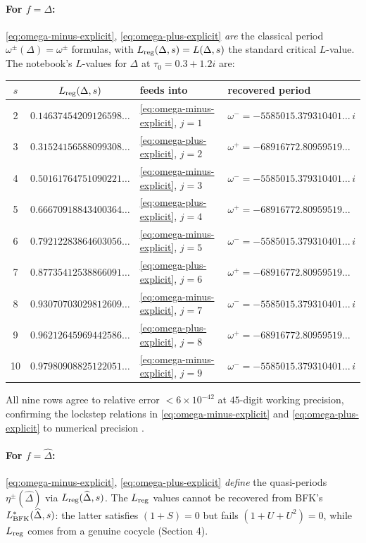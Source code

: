 \documentclass[11pt,letterpaper]{article}
\newcommand{\Dhat}{\widehat{\Delta}}
\begin{document}
\paragraph{For $f = \Delta$:}
\eqref{eq:omega-minus-explicit}, \eqref{eq:omega-plus-explicit} \emph{are} the
classical period $\omega^\pm(\Delta) = \omega^\pm$ formulas, with
$L_{\rm reg}(\Delta, s) = L(\Delta, s)$ the standard critical $L$-value.  The
notebook's $L$-values for $\Delta$ at $\tau_0 = 0.3 + 1.2i$ are:
\begin{center}
\begin{tabular}{ccll}
\toprule
$s$ & $L_{\rm reg}(\Delta, s)$ & feeds into & recovered period\\
\midrule
2  & $0.14637454209126598\ldots$ & \eqref{eq:omega-minus-explicit}, $j=1$ &
   $\omega^- = -5585015.379310401\ldots\,i$ \\
3  & $0.31524156588099308\ldots$ & \eqref{eq:omega-plus-explicit},  $j=2$ &
   $\omega^+ = -68916772.80959519\ldots$ \\
4  & $0.50161764751090221\ldots$ & \eqref{eq:omega-minus-explicit}, $j=3$ &
   $\omega^- = -5585015.379310401\ldots\,i$ \\
5  & $0.66670918843400364\ldots$ & \eqref{eq:omega-plus-explicit},  $j=4$ &
   $\omega^+ = -68916772.80959519\ldots$ \\
6  & $0.79212283864603056\ldots$ & \eqref{eq:omega-minus-explicit}, $j=5$ &
   $\omega^- = -5585015.379310401\ldots\,i$ \\
7  & $0.87735412538866091\ldots$ & \eqref{eq:omega-plus-explicit},  $j=6$ &
   $\omega^+ = -68916772.80959519\ldots$ \\
8  & $0.93070703029812609\ldots$ & \eqref{eq:omega-minus-explicit}, $j=7$ &
   $\omega^- = -5585015.379310401\ldots\,i$ \\
9  & $0.96212645969442586\ldots$ & \eqref{eq:omega-plus-explicit},  $j=8$ &
   $\omega^+ = -68916772.80959519\ldots$ \\
10 & $0.97980908825122051\ldots$ & \eqref{eq:omega-minus-explicit}, $j=9$ &
   $\omega^- = -5585015.379310401\ldots\,i$ \\
\bottomrule
\end{tabular}
\end{center}
All nine rows agree to relative error $<6\times 10^{-42}$ at $45$-digit
working precision, confirming the lockstep relations in
\eqref{eq:omega-minus-explicit} and \eqref{eq:omega-plus-explicit} to
numerical precision \cite{VerifyL}.

\paragraph{For $f = \Dhat$:}
\eqref{eq:omega-minus-explicit}, \eqref{eq:omega-plus-explicit} \emph{define}
the quasi-periods $\eta^\pm(\Dhat)$ via $L_{\rm reg}(\Dhat, s)$.  The
$L_{\rm reg}$ values cannot be recovered from BFK's $L^*_{\rm BFK}(\Dhat, s)$:
the latter satisfies $(1+S) = 0$ but fails $(1+U+U^2) = 0$, while
$L_{\rm reg}$ comes from a genuine cocycle (Section 4).
\end{document}

